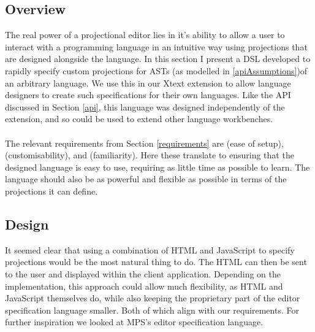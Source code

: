 \documentclass{article}
\begin{document}
{\subsection{Overview}
The real power of a projectional editor lies in it's ability to allow a user to interact with a programming language in an intuitive way using projections that are designed alongside the language. In this section I present a DSL developed to rapidly specify custom projections for ASTs (as modelled in \ref{apiAssumptions})of an arbitrary language. We use this in our Xtext extension to allow language designers to create such specifications for their own languages. Like the API discussed in Section \ref{api}, this language was designed independently of the extension, and so could be used to extend other language workbenches.
\\
\\
The relevant requirements from Section \ref{requirements} are \RSetup (ease of setup), \RCustom (customisability), and \RFamiliarity (familiarity). Here these translate to ensuring that the designed language is easy to use, requiring as little time as possible to learn. The language should also be as powerful and flexible as possible in terms of the projections it can define.

\subsection{Design}

It seemed clear that using a combination of HTML and JavaScript to specify projections would be the most natural thing to do. The HTML can then be sent to the user and displayed within the client application. Depending on the implementation, this approach could allow much flexibility, as HTML and JavaScript themselves do, while also keeping the proprietary part of the editor specification language smaller. Both of which align with our requirements. For further inspiration we looked at MPS's editor specification language.

}
\end{document}
